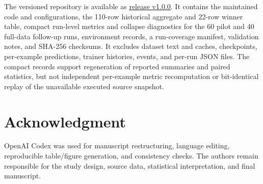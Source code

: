 \documentclass{SPC}
\begin{document}

The versioned repository is available as \href{https://github.com/LEESY-X/Domain_fine-tuning_experiments/tree/ieie-spc-v1.0.0}{\underline{release v1.0.0}}. It contains the maintained code and configurations, the 110-row historical aggregate and 22-row winner table, compact run-level metrics and collapse diagnostics for the 60 pilot and 40 full-data follow-up runs, environment records, a run-coverage manifest, validation notes, and SHA-256 checksums. It excludes dataset text and caches, checkpoints, per-example predictions, trainer histories, events, and per-run JSON files. The compact records support regeneration of reported summaries and paired statistics, but not independent per-example metric recomputation or bit-identical replay of the unavailable executed source snapshot.


\section*{Acknowledgment}

OpenAI Codex was used for manuscript restructuring, language editing, reproducible table/figure generation, and consistency checks. The authors remain responsible for the study design, source data, statistical interpretation, and final manuscript.
\end{document}
